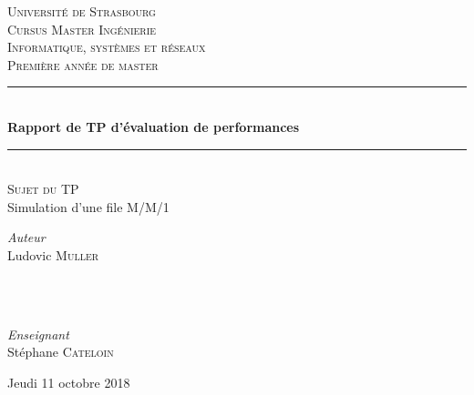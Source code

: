 \documentclass[]{article}
\begin{document}
\begin{titlepage}
	\newcommand{\HRule}{\rule{\linewidth}{0.5mm}}

	\center
	\textsc{\LARGE Université de Strasbourg}\\[1.5cm]
	\textsc{\Large Cursus Master Ingénierie \\ Informatique, systèmes et réseaux}\\[0.5cm]
	\textsc{\large Première année de master}\\[0.5cm]

	\HRule\\[0.4cm]
	{\huge\bfseries Rapport de TP d'évaluation de performances}\\[0.4cm]
	\HRule\\[1.5cm]

	\textsc{\large Sujet du TP}\\[0.5cm]
	Simulation d'une file M/M/1
	\vfill

	\begin{minipage}{0.4\textwidth}
		\begin{flushleft}
			\large
			\textit{Auteur}\\
			Ludovic \textsc{Muller}
		\end{flushleft}
	\end{minipage}
	~
	\begin{minipage}{0.4\textwidth}
		\begin{flushright}
			\large
			\textit{\\Enseignant}\\
			Stéphane \textsc{Cateloin}\\
		\end{flushright}
	\end{minipage}

	\vfill\vfill

	Jeudi 11 octobre 2018

\end{titlepage}
\end{document}

